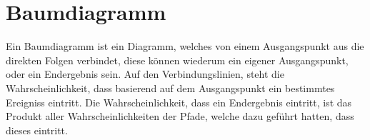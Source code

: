 \documentclass{article}
\begin{document}
 
\section{Baumdiagramm}
\begin{minipage}{\dimexpr\linewidth-5cm} 
 Ein Baumdiagramm ist ein Diagramm, welches von einem Ausgangspunkt aus die direkten Folgen verbindet, diese können wiederum ein eigener Ausgangspunkt, oder ein Endergebnis sein. Auf den Verbindungslinien, steht die Wahrscheinlichkeit, dass basierend auf dem Ausgangspunkt ein bestimmtes Ereigniss eintritt. Die Wahrscheinlichkeit, dass ein Endergebnis eintritt, ist das Produkt aller Wahrscheinlichkeiten der Pfade, welche dazu geführt hatten, dass dieses eintritt.
\end{minipage}
\hfill
\begin{minipage}{5cm}
 \center
\end{minipage} 
 
\end{document}
